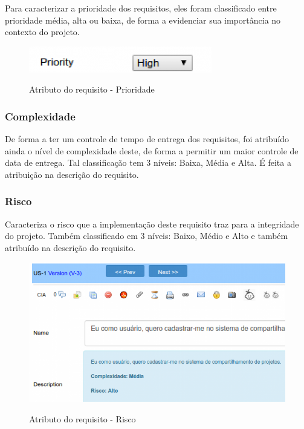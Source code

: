 Para caracterizar a prioridade dos requisitos, eles foram classificado entre prioridade média, alta ou baixa, de forma a evidenciar sua importância no contexto do projeto.

\FloatBarrier
\begin{figure}[!htpd]
		\centering
		\includegraphics[scale=0.4]{figuras/prioridade}
		\label{img:prioridade}
		\caption{Atributo do requisito - Prioridade}
\end{figure}
\FloatBarrier

\subsubsection{Complexidade}

De forma a ter um controle de tempo de entrega dos requisitos, foi atribuído ainda o nível de complexidade deste, de forma a permitir um maior controle de data de entrega. Tal classificação tem 3 níveis: Baixa, Média e Alta. É feita a atribuição na descrição do requisito.

\subsubsection{Risco}

Caracteriza o risco que a implementação deste requisito traz para a integridade do projeto. Também classificado em 3 níveis: Baixo, Médio e Alto e também atribuído na descrição do requisito.

\FloatBarrier
\begin{figure}[!htpd]
		\centering
		\includegraphics[scale=0.4]{figuras/risco}
		\label{img:risco}
		\caption{Atributo do requisito - Risco}
\end{figure}
\FloatBarrier

